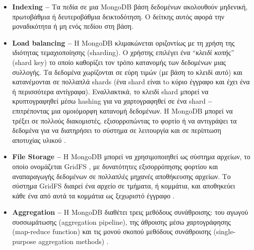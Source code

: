 \begin{itemize}
    \item {}\textbf{Indexing --} Τα πεδία σε μια MongoDB βάση δεδομένων ακολουθούν μηδενική, πρωτοβάθμια ή δευτεροβάθμια δεικτοδότηση. Ο δείτκης αυτός αφορά την μοναδικότητα ή μη ενός πεδίου στη βάση.
    \item {}\textbf{Load balancing --}  Η MongoDB κλιμακώνεται οριζοντίως με τη χρήση της ιδιότητας τεμαχιοποίησης (sharding). Ο χρήστης επιλέγει ένα ``\textit{κλειδί κοπής}'' (shard key) το οποίο καθορίζει τον τρόπο κατανομής των δεδομένων μιας συλλογής. Τα δεδομένα χωρίζονται σε εύρη τιμών (με βάση το κλειδί αυτό) και κατανέμονται σε πολλαπλά shards (ένα shard είναι to κύριο έγγραφο και έχει ένα ή περισσότερα αντίγραφα). Εναλλακτικά, το κλειδί shard μπορεί να κρυπτογραφηθεί μέσω hashing για να χαρτογραφηθεί σε ένα shard \textbf{--} επιτρέποντας μια ομοιόμορφη κατανομή δεδομένων. Η MongoDB μπορεί να τρέξει σε πολλούς διακομιστές, εξισορροπώντας το φορτίο ή να αντιγράψει τα δεδομένα για να διατηρήσει το σύστημα σε λειτουργία και σε περίπτωση αποτυχίας υλικού \cite{[MONGO3]}.
     \item {}\textbf{File Storage --}  Η MongoDB μπορεί να χρησιμοποιηθεί ως σύστημα αρχείων, το οποίο ονομάζεται GridFS \cite{[MONGO4]}, με δυνατότητες εξισορρόπησης φορτίου και αναπαραγωγής δεδομένων σε πολλαπλές μηχανές αποθήκευσης αρχείων. Το σύστημα GridFS διαιρεί ένα αρχείο σε τμήματα, ή κομμάτια, και αποθηκεύει κάθε ένα από αυτά τα κομμάτια ως ξεχωριστό έγγραφο \cite{[MONGO5]}.
     \item {}\textbf{Aggregation --}  Η MongoDB διαθέτει τρεις μεθόδους συνάθροισης: του αγωγού συσσωμάτωσης (aggregation pipeline), της άθροισης μέσω χαρτογράφησης (map-reduce function) και τις μονού σκοπού μεθόδους συνάθροισης (single-purpose aggregation methods) \cite{[MONGO6],[MONGO7]}.
\end{itemize}

